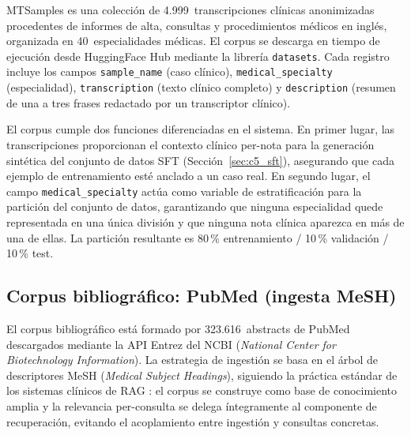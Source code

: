 \documentclass[11pt,a4paper,spanish]{book}
\numberwithin{equation}{chapter}
\numberwithin{figure}{chapter}
\begin{document}
MTSamples \cite{mtsamples_medical_2017} es una colección de 4.999~transcripciones clínicas anonimizadas procedentes de informes de alta, consultas y procedimientos médicos en inglés, organizada en 40~especialidades médicas. El corpus se descarga en tiempo de ejecución desde HuggingFace Hub mediante la librería \texttt{datasets}. Cada registro incluye los campos \texttt{sample\_name} (caso clínico), \texttt{medical\_specialty} (especialidad), \texttt{transcription} (texto clínico completo) y \texttt{description} (resumen de una a tres frases redactado por un transcriptor clínico).

El corpus cumple dos funciones diferenciadas en el sistema. En primer lugar, las transcripciones proporcionan el contexto clínico per-nota para la generación sintética del conjunto de datos SFT (Sección~\ref{sec:c5_sft}), asegurando que cada ejemplo de entrenamiento esté anclado a un caso real. En segundo lugar, el campo \texttt{medical\_specialty} actúa como variable de estratificación para la partición del conjunto de datos, garantizando que ninguna especialidad quede representada en una única división y que ninguna nota clínica aparezca en más de una de ellas. La partición resultante es 80\,\% entrenamiento / 10\,\% validación / 10\,\% test.

\subsection{Corpus bibliográfico: PubMed (ingesta MeSH)}
\label{sec:c5_pubmed}

El corpus bibliográfico está formado por 323.616~abstracts de PubMed descargados mediante la API Entrez del NCBI (\textit{National Center for Biotechnology Information}). La estrategia de ingestión se basa en el árbol de descriptores MeSH (\textit{Medical Subject Headings}), siguiendo la práctica estándar de los sistemas clínicos de RAG \cite{zakka_almanac_2024, lozano_clinfoai_2023, xiong_benchmarking_2024}: el corpus se construye como base de conocimiento amplia y la relevancia per-consulta se delega íntegramente al componente de recuperación, evitando el acoplamiento entre ingestión y consultas concretas.
\end{document}
